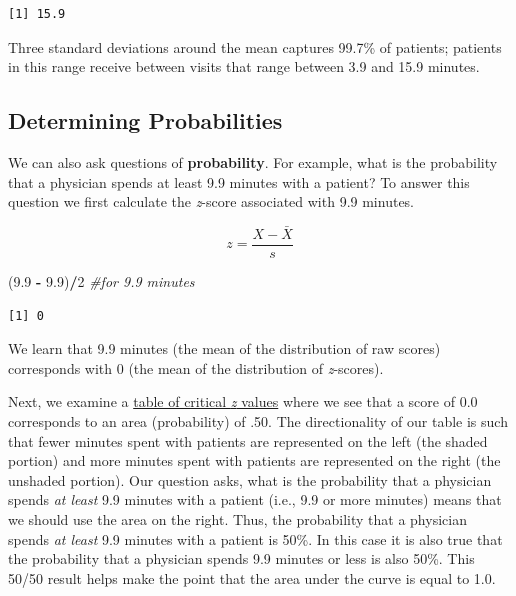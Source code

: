 \documentclass[
  11pt,
]{book}
\newenvironment{Shaded}{\begin{snugshade}}{\end{snugshade}}
\newcommand{\CommentTok}[1]{\textcolor[rgb]{0.37,0.37,0.37}{\textit{#1}}}
\newcommand{\DecValTok}[1]{\textcolor[rgb]{0.06,0.06,0.06}{#1}}
\newcommand{\FloatTok}[1]{\textcolor[rgb]{0.06,0.06,0.06}{#1}}
\newcommand{\NormalTok}[1]{#1}
\newcommand{\SpecialCharTok}[1]{\textcolor[rgb]{0.43,0.43,0.43}{\textbf{#1}}}
\begin{document}
\begin{verbatim}
[1] 15.9
\end{verbatim}

Three standard deviations around the mean captures 99.7\% of patients; patients in this range receive between visits that range between 3.9 and 15.9 minutes.

\hypertarget{determining-probabilities}{%
\subsection{Determining Probabilities}\label{determining-probabilities}}

We can also ask questions of \textbf{probability}. For example, what is the probability that a physician spends at least 9.9 minutes with a patient? To answer this question we first calculate the \emph{z}-score associated with 9.9 minutes.

\[z=\frac{X-\bar{X}}{s}\]

\begin{Shaded}
\begin{Highlighting}[]
\NormalTok{(}\FloatTok{9.9} \SpecialCharTok{{-}} \FloatTok{9.9}\NormalTok{)}\SpecialCharTok{/}\DecValTok{2}  \CommentTok{\#for 9.9 minutes}
\end{Highlighting}
\end{Shaded}

\begin{verbatim}
[1] 0
\end{verbatim}

We learn that 9.9 minutes (the mean of the distribution of raw scores) corresponds with 0 (the mean of the distribution of \emph{z}-scores).

Next, we examine a \href{https://www.statology.org/z-table/}{table of critical \emph{z} values} where we see that a score of 0.0 corresponds to an area (probability) of .50. The directionality of our table is such that fewer minutes spent with patients are represented on the left (the shaded portion) and more minutes spent with patients are represented on the right (the unshaded portion). Our question asks, what is the probability that a physician spends \emph{at least} 9.9 minutes with a patient (i.e., 9.9 or more minutes) means that we should use the area on the right. Thus, the probability that a physician spends \emph{at least} 9.9 minutes with a patient is 50\%. In this case it is also true that the probability that a physician spends 9.9 minutes or less is also 50\%. This 50/50 result helps make the point that the area under the curve is equal to 1.0.
\end{document}
